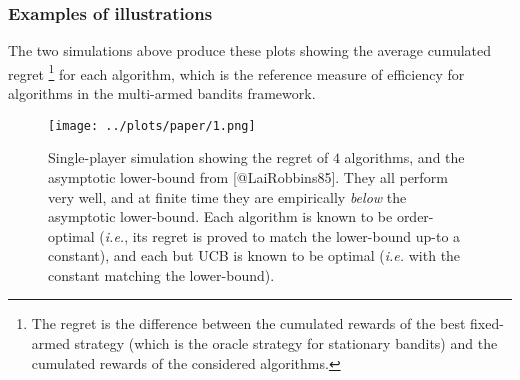 \begin{Shaded}
\begin{Highlighting}[]
\KeywordTok{||} 
 
\end{Highlighting}
\end{Shaded}

\hypertarget{examples-of-illustrations}{%
\subsubsection{Examples of
illustrations}\label{examples-of-illustrations}}

The two simulations above produce these plots showing the average
cumulated regret \footnote{The regret is the difference between the
  cumulated rewards of the best fixed-armed strategy (which is the
  oracle strategy for stationary bandits) and the cumulated rewards of
  the considered algorithms.} for each algorithm, which is the reference
measure of efficiency for algorithms in the multi-armed bandits
framework.

\begin{figure}
\centering
\texttt{[image: ../plots/paper/1.png]}
\caption{Single-player simulation showing the regret of \(4\)
algorithms, and the asymptotic lower-bound from {[}@LaiRobbins85{]}.
They all perform very well, and at finite time they are empirically
\emph{below} the asymptotic lower-bound. Each algorithm is known to be
order-optimal (\emph{i.e.}, its regret is proved to match the
lower-bound up-to a constant), and each but UCB is known to be optimal
(\emph{i.e.} with the constant matching the
lower-bound).\label{fig:plot1}}
\end{figure}

